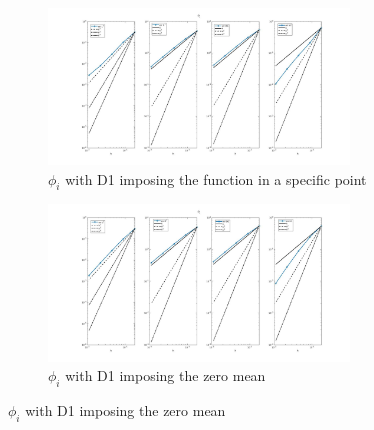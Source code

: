 \documentclass[a4paper,11pt]{article}
\begin{document}
\begin{figure}[h]
\begin{subfigure}{0.5\textwidth}
\includegraphics[width = 8cm]{./D1_Phii_1.jpg}
\caption*{$\phi_i$ with D1 imposing the function in a specific point}
\label{Phii_1}
\end{subfigure}
\begin{subfigure}{0.5\textwidth}
\includegraphics[width =8cm]{./D1_Phii_2.jpg}
\caption*{$\phi_i$ with D1 imposing the zero mean}
\label{Phii_2}
\end{subfigure}
\end{figure}
\end{document}
